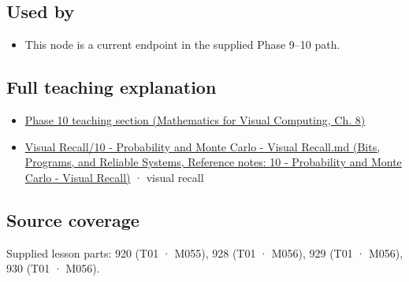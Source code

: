 \subsection{Used by}\label{appendix-f0437ea55a47-used-by}

\hypertarget{appendix-f0437ea55a47-used-by}{}

\begin{itemize}
\tightlist
\item
  This node is a current endpoint in the supplied Phase 9--10 path.
\end{itemize}

\subsection{Full teaching explanation}\label{appendix-f0437ea55a47-full-teaching-explanation}

\hypertarget{appendix-f0437ea55a47-full-teaching-explanation}{}

\begin{itemize}
\tightlist
\item
  \href{../02-Mathematics-for-Visual-Computing/main.pdf\#nameddest=02-foundations-ii-ch024-waiting-times-event-counts-and-covariance-geometry}{Phase 10 teaching section (Mathematics for Visual Computing, Ch. 8)}
\item
  \href{../01-Bits-Programs-and-Reliable-Systems/main.pdf\#nameddest=appendix-cb5af353ef77}{Visual Recall/10 - Probability and Monte Carlo - Visual Recall.md (Bits, Programs, and Reliable Systems, Reference notes: 10 - Probability and Monte Carlo - Visual Recall)} · visual recall
\end{itemize}

\subsection{Source coverage}\label{appendix-f0437ea55a47-source-coverage}

\hypertarget{appendix-f0437ea55a47-source-coverage}{}

Supplied lesson parts: 920 (T01 · M055), 928 (T01 · M056), 929 (T01 · M056), 930 (T01 · M056).
